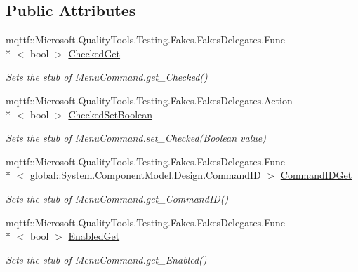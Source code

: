 \subsection*{Public Attributes}
\begin{DoxyCompactItemize}
\item 
mqttf\-::\-Microsoft.\-Quality\-Tools.\-Testing.\-Fakes.\-Fakes\-Delegates.\-Func\\*
$<$ bool $>$ \hyperlink{class_system_1_1_component_model_1_1_design_1_1_fakes_1_1_stub_menu_command_a709b02fc2fab79e3eb94a5979f67a788}{Checked\-Get}
\begin{DoxyCompactList}\small\item\em Sets the stub of Menu\-Command.\-get\-\_\-\-Checked()\end{DoxyCompactList}\item 
mqttf\-::\-Microsoft.\-Quality\-Tools.\-Testing.\-Fakes.\-Fakes\-Delegates.\-Action\\*
$<$ bool $>$ \hyperlink{class_system_1_1_component_model_1_1_design_1_1_fakes_1_1_stub_menu_command_a3a28162a41ef9385de1778f1ac230881}{Checked\-Set\-Boolean}
\begin{DoxyCompactList}\small\item\em Sets the stub of Menu\-Command.\-set\-\_\-\-Checked(\-Boolean value)\end{DoxyCompactList}\item 
mqttf\-::\-Microsoft.\-Quality\-Tools.\-Testing.\-Fakes.\-Fakes\-Delegates.\-Func\\*
$<$ global\-::\-System.\-Component\-Model.\-Design.\-Command\-I\-D $>$ \hyperlink{class_system_1_1_component_model_1_1_design_1_1_fakes_1_1_stub_menu_command_aa0f4fc8d7a2bc3505ef4db12f72fdf98}{Command\-I\-D\-Get}
\begin{DoxyCompactList}\small\item\em Sets the stub of Menu\-Command.\-get\-\_\-\-Command\-I\-D()\end{DoxyCompactList}\item 
mqttf\-::\-Microsoft.\-Quality\-Tools.\-Testing.\-Fakes.\-Fakes\-Delegates.\-Func\\*
$<$ bool $>$ \hyperlink{class_system_1_1_component_model_1_1_design_1_1_fakes_1_1_stub_menu_command_a7c421af52cb54a8a06ac6c1bdcff7dab}{Enabled\-Get}
\begin{DoxyCompactList}\small\item\em Sets the stub of Menu\-Command.\-get\-\_\-\-Enabled()\end{DoxyCompactList}\item 

\end{DoxyCompactItemize}
